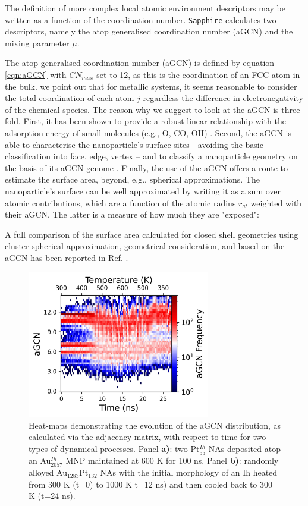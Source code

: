 The definition of more complex local atomic environment descriptors may be written as a function of the coordination number. \texttt{Sapphire} calculates two descriptors, namely the atop generalised coordination number (aGCN) and the mixing parameter $\mu$. 

The atop generalised coordination number (aGCN) \cite{Calle-Vallejo2014} is defined by equation \ref{eqn:aGCN}
with $CN_{max}$ set to 12, as this is the coordination of an FCC atom in the bulk. we point out that for metallic systems, it seems reasonable to consider the total coordination of each atom $j$ regardless the difference in electronegativity of the chemical species.
%
The reason why we suggest to look at the aGCN is three-fold. First, it has been shown to provide a robust linear relationship with the adsorption energy of small molecules (e.g., O, CO, OH) \cite{Calle2015}.
Second, the aGCN is able to characterise the nanoparticle's surface sites - avoiding the basic classification into face, edge, vertex -- and to classify a nanoparticle geometry on the basis of its aGCN-genome \cite{Rossi2019}.
%
Finally, the use of the aGCN offers a route to estimate the surface area, beyond, e.g., spherical approximations. 
%
The nanoparticle's surface can be well approximated by writing it as a sum over atomic contributions, which are a function of the atomic radius $r_{at}$ weighted with their aGCN. The latter is a measure of how much they are "exposed": \cite{Rossi2020}

A full comparison of the surface area calculated for closed shell geometries using cluster spherical approximation, geometrical consideration, and based on the aGCN has been reported in Ref. \cite{Rossi2020}.

\begin{figure}[t!]
    \centering
    \includegraphics[width = 8cm]{figures/Sapphire/aGCN.jpeg}
    \caption{Heat-maps demonstrating the evolution of the aGCN distribution, as calculated via the adjacency matrix, with respect to time for two types of dynamical processes. Panel \textbf{a)}: two Pt$_{55}^{Ih}$ NAs deposited atop an Au$_{2057}^{Ih}$ MNP maintained at 600 K for 100 ns. Panel \textbf{b)}: randomly alloyed Au$_{1283}$Pt$_{132}$ NAs with the initial morphology of an Ih heated from 300 K (t=0) to 1000 K t=12 ns) and then cooled back to 300 K (t=24 ns). }
\label{fig:agcn}
\end{figure}

